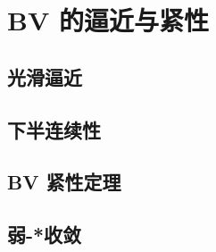 \section{BV 的逼近与紧性}
\label{b1:sec:2702}


\subsection{光滑逼近}
\label{b1:subsec:270201}

\subsection{下半连续性}
\label{b1:subsec:270202}

\subsection{BV 紧性定理}
\label{b1:subsec:270203}

\subsection{弱-*收敛}
\label{b1:subsec:270204}


